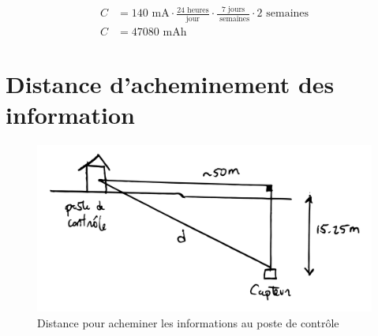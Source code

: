 \begin{align*}
    C &= 140 \text{ mA} \cdot \frac{24\text{ heures}}{\text{jour}} \cdot \frac{7\text{ jours}}{\text{ semaines}} \cdot 2\text{ semaines}\\
    C &= 47 080 \text{ mAh}
\end{align*}

\chapter{Distance d'acheminement des information}

\begin{figure}[!htb]
    \centering
    \includegraphics[width=0.5\linewidth]{fig/distance_min.png}
    \caption{Distance pour acheminer les informations au poste de contrôle}
    \label{fig:distance_acheminer}
\end{figure}